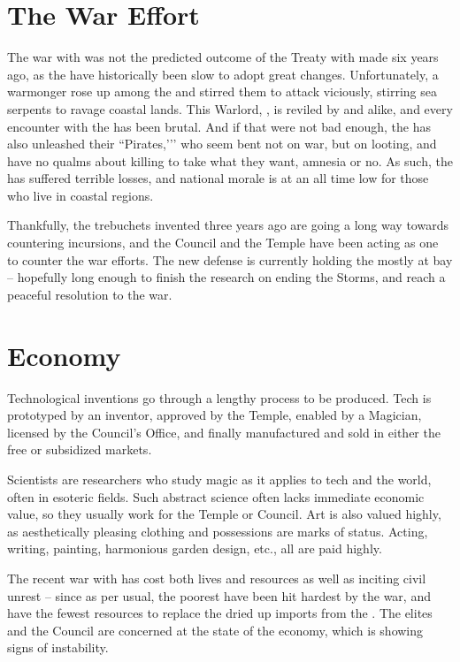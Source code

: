 \documentclass[blue]{GL2020}
\begin{document}
\section*{The War Effort}
The war with \pShip{} was not the predicted outcome of the Treaty with \pFarm{} made six years ago, as the \pShippies{} have historically been slow to adopt great changes. Unfortunately, a warmonger rose up among the \pShippies{} and stirred them to attack viciously, stirring sea serpents to ravage coastal lands. This Warlord, \cLoud{\full}, is reviled by \pTechies{} and \pFarm{} alike, and every encounter with the \pShippies{} has been brutal. And if that were not bad enough, the \pShip{} has also unleashed their ``Pirates,’’’ who seem bent not on war, but on looting, and have no qualms about killing to take what they want, amnesia or no. As such, the \pTech{} has suffered terrible losses, and national morale is at an all time low for those who live in coastal regions. 

Thankfully, the trebuchets invented three years ago are going a long way towards countering \pShip{} incursions, and the Council and the Temple have been acting as one to counter the \pShip{} war efforts. The new defense is currently holding the \pShip{} mostly at bay -- hopefully long enough to finish the research on ending the Storms, and reach a peaceful resolution to the war.
	
\section*{Economy}
Technological inventions go through a lengthy process to be produced. Tech is prototyped by an inventor, approved by the Temple, enabled by a Magician, licensed by the Council’s Office, and finally manufactured and sold in either the free or subsidized markets. 

Scientists are researchers who study magic as it applies to tech and the world, often in esoteric fields. Such abstract science often lacks immediate economic value, so they usually work for the Temple or Council. Art is also valued highly, as aesthetically pleasing clothing and possessions are marks of status. Acting, writing, painting, harmonious garden design, etc., all are paid highly.  

The recent war with \pShip{} has cost both lives and resources as well as inciting civil unrest -- since as per usual, the poorest have been hit hardest by the war, and have the fewest resources to replace the dried up imports from the \pShippies{}. The elites and the Council are concerned at the state of the economy, which is showing signs of instability.
\end{document}
